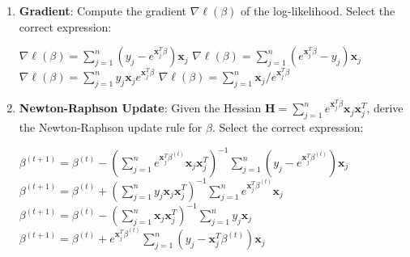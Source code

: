 \documentclass[12pt,letterpaper, onecolumn]{exam}
\begin{document}
\begin{questions}
\begin{enumerate}[label=(\alph*)]
    \item \textbf{Gradient}: Compute the gradient \( \nabla \ell(\beta) \) of the log-likelihood. Select the correct expression:
    \begin{choices}
        \choice \( \nabla \ell(\beta) = \sum_{j=1}^n (y_j - e^{\mathbf{x}_j^T \beta}) \mathbf{x}_j \)
        \choice \( \nabla \ell(\beta) = \sum_{j=1}^n (e^{\mathbf{x}_j^T \beta} - y_j) \mathbf{x}_j \)
        \choice \( \nabla \ell(\beta) = \sum_{j=1}^n y_j \mathbf{x}_j e^{\mathbf{x}_j^T \beta} \)
        \choice \( \nabla \ell(\beta) = \sum_{j=1}^n \mathbf{x}_j / e^{\mathbf{x}_j^T \beta} \)
    \end{choices}

    \item \textbf{Newton-Raphson Update}: Given the Hessian \( \mathbf{H} = \sum_{j=1}^n e^{\mathbf{x}_j^T \beta} \mathbf{x}_j \mathbf{x}_j^T \), derive the Newton-Raphson update rule for \( \beta \). Select the correct expression: 
    \begin{choices}
        \choice \( \beta^{(t+1)} = \beta^{(t)} - \left( \sum_{j=1}^n e^{\mathbf{x}_j^T \beta^{(t)}} \mathbf{x}_j \mathbf{x}_j^T \right)^{-1} \sum_{j=1}^n (y_j - e^{\mathbf{x}_j^T \beta^{(t)}}) \mathbf{x}_j \)
        \choice \( \beta^{(t+1)} = \beta^{(t)} + \left( \sum_{j=1}^n y_j \mathbf{x}_j \mathbf{x}_j^T \right)^{-1} \sum_{j=1}^n e^{\mathbf{x}_j^T \beta^{(t)}} \mathbf{x}_j \)
        \choice \( \beta^{(t+1)} = \beta^{(t)} - \left( \sum_{j=1}^n \mathbf{x}_j \mathbf{x}_j^T \right)^{-1} \sum_{j=1}^n y_j \mathbf{x}_j \)
        \choice \( \beta^{(t+1)} = \beta^{(t)} + e^{\mathbf{x}_j^T \beta^{(t)}} \sum_{j=1}^n (y_j - \mathbf{x}_j^T \beta^{(t)}) \mathbf{x}_j \)
    \end{choices}
\end{enumerate}

\begin{solution}
    \begin{parts}
        \part 
        \part 
        \part 
        \part 
    \end{parts}
\end{solution}


\end{questions}
\end{document}
